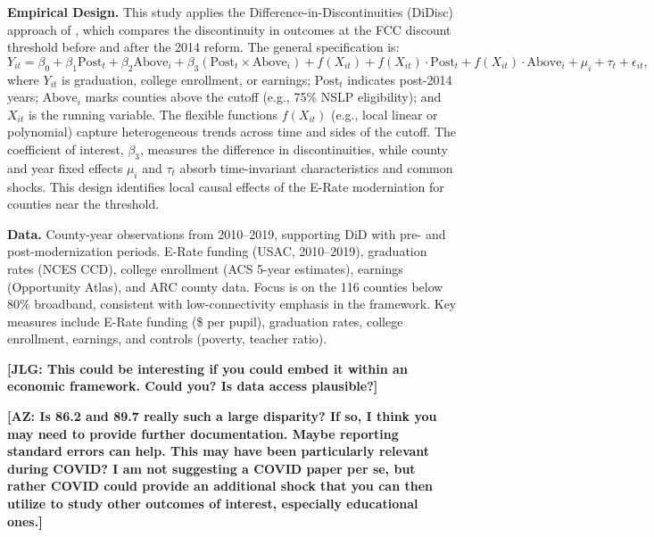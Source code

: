 \textbf{Empirical Design.} This study applies the Difference-in-Discontinuities (DiDisc) approach of \citet{grembiFiscalRulesMatter2016}, which compares the discontinuity in outcomes at the FCC discount threshold before and after the 2014 reform. The general specification is:
\[
Y_{it} = \beta_0 + \beta_1 \text{Post}_t + \beta_2 \text{Above}_i + \beta_3 (\text{Post}_t \times \text{Above}_i) 
+ f(X_{it}) + f(X_{it}) \cdot \text{Post}_t + f(X_{it}) \cdot \text{Above}_i 
+ \mu_i + \tau_t + \epsilon_{it},
\]
where $Y_{it}$ is graduation, college enrollment, or earnings; $\text{Post}_t$ indicates post-2014 years; $\text{Above}_i$ marks counties above the cutoff (e.g., 75\% NSLP eligibility); and $X_{it}$ is the running variable. The flexible functions $f(X_{it})$ (e.g., local linear or polynomial) capture heterogeneous trends across time and sides of the cutoff. The coefficient of interest, $\beta_3$, measures the difference in discontinuities, while county and year fixed effects $\mu_i$ and $\tau_t$ absorb time-invariant characteristics and common shocks. This design identifies local causal effects of the E-Rate moderniation for counties near the threshold.


\textbf{Data.} County-year observations from 2010–2019, supporting DiD with pre- and post-modernization periods. E-Rate funding (USAC, 2010–2019), graduation rates (NCES CCD), college enrollment (ACS 5-year estimates), earnings (Opportunity Atlas), and ARC county data. Focus is on the 116 counties below 80\% broadband, consistent with low-connectivity emphasis in the framework. Key measures include E-Rate funding (\$ per pupil), graduation rates, college enrollment, earnings, and controls (poverty, teacher ratio).

\bigskip

\noindent \textbf{[JLG: This could be interesting if you could embed it within an economic framework. Could you? Is data access plausible?]}

\vspace{3em}

\noindent \textbf{[AZ: Is 86.2 and 89.7 really such a large disparity? If so, I think you may need to provide further documentation. Maybe reporting standard errors can help. This may have been particularly relevant during COVID? I am not suggesting a COVID paper per se, but rather COVID could provide an additional shock that you can then utilize to study other outcomes of interest, especially educational ones.]}








